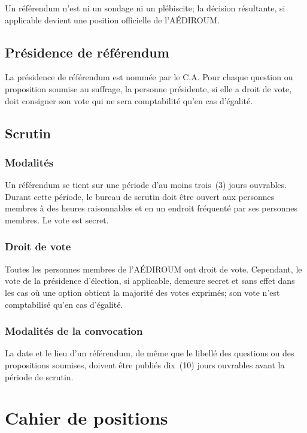 \documentclass{aediroum}
\begin{document}
Un référendum n'est ni un sondage ni un plébiscite; la décision résultante, si applicable devient une position officielle de l'AÉDIROUM.

\subsection{Présidence de référendum}\label{sec:president-de-referendum}
La présidence de référendum est nommée par le C.A. Pour chaque question ou proposition soumise au suffrage, la personne présidente, si elle a droit de vote, doit consigner son vote qui ne sera comptabilité qu'en cas d'égalité.

\subsection{Scrutin}\label{sec:scrutin}
\subsubsection{Modalités}\label{sec:modalites-scrutin}

Un référendum se tient sur une période d'au moins trois~(3) jours ouvrables. Durant cette période, le bureau de scrutin doit être ouvert aux personnes membres à des heures raisonnables et en un endroit fréquenté par ses personnes membres. Le vote est secret.

\subsubsection{Droit de vote}\label{sec:droit-de-vote}

Toutes les personnes membres de l'AÉDIROUM ont droit de vote. Cependant, le vote de la présidence d'élection, si applicable, demeure secret et sans effet dans les cas où une option obtient la majorité des votes exprimés; son vote n'est comptabilisé qu'en cas d'égalité.

\subsubsection{Modalités de la convocation}\label{sec:modalites-convocation}

La date et le lieu d'un référendum, de même que le libellé des questions ou des propositions soumises, doivent être publiés dix~(10) jours ouvrables avant la période de scrutin.

\section{Cahier de positions}\label{sec:cahier-de-positions}
\end{document}
